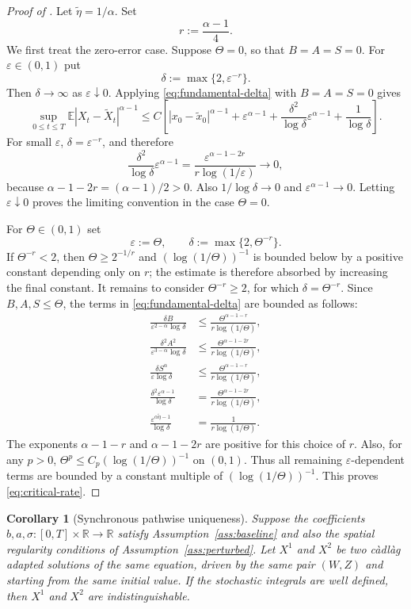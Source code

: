 \documentclass[10pt,a4paper]{amsart}
\newtheorem{corollary}[theorem]{Corollary}
\newcommand{\R}{\mathbb{R}}
\newcommand{\E}{\mathbb{E}}
\newcommand{\1}{\mathbf{1}}
\newcommand{\wt}{\tilde}
\newcommand{\eps}{\varepsilon}
\begin{document}
\begin{proof}[Proof of ]
Let $\wt\eta=1/\alpha$. Set
\[
  r:=\frac{\alpha-1}{4}.
\]
We first treat the zero-error case. Suppose $\Theta=0$, so that $B=A=S=0$. For $\eps\in(0,1)$ put
\[
  \delta:=\max\{2,\eps^{-r}\}.
\]
Then $\delta\to\infty$ as $\eps\downarrow0$. Applying \eqref{eq:fundamental-delta} with $B=A=S=0$ gives
\[
\sup_{0\le t\le T}\E|X_t-\wt X_t|^{\alpha-1}
\le C\left[|x_0-\wt x_0|^{\alpha-1}+\eps^{\alpha-1}
+\frac{\delta^2}{\log\delta}\eps^{\alpha-1}
+\frac{1}{\log\delta}\right].
\]
For small $\eps$, $\delta=\eps^{-r}$, and therefore
\[
  \frac{\delta^2}{\log\delta}\eps^{\alpha-1}
  =\frac{\eps^{\alpha-1-2r}}{r\log(1/\eps)}\longrightarrow0,
\]
because $\alpha-1-2r=(\alpha-1)/2>0$. Also $1/\log\delta\to0$ and $\eps^{\alpha-1}\to0$. Letting $\eps\downarrow0$ proves the limiting convention in the case $\Theta=0$.

For $\Theta\in(0,1)$ set
\[
  \eps:=\Theta,
  \qquad
  \delta:=\max\{2,\Theta^{-r}\}.
\]
If $\Theta^{-r}<2$, then $\Theta\ge 2^{-1/r}$ and $(\log(1/\Theta))^{-1}$ is bounded below by a positive constant depending only on $r$; the estimate is therefore absorbed by increasing the final constant. It remains to consider $\Theta^{-r}\ge2$, for which $\delta=\Theta^{-r}$. Since $B,A,S\le\Theta$, the terms in \eqref{eq:fundamental-delta} are bounded as follows:
\begin{align*}
\frac{\delta B}{\eps^{2-\alpha}\log\delta}
&\le \frac{\Theta^{\alpha-1-r}}{r\log(1/\Theta)},\\
\frac{\delta^2 A^2}{\eps^{3-\alpha}\log\delta}
&\le \frac{\Theta^{\alpha-1-2r}}{r\log(1/\Theta)},\\
\frac{\delta S^\alpha}{\eps\log\delta}
&\le \frac{\Theta^{\alpha-1-r}}{r\log(1/\Theta)},\\
\frac{\delta^2\eps^{\alpha-1}}{\log\delta}
&=\frac{\Theta^{\alpha-1-2r}}{r\log(1/\Theta)},\\
\frac{\eps^{\alpha\wt\eta-1}}{\log\delta}
&=\frac{1}{r\log(1/\Theta)}.
\end{align*}
The exponents $\alpha-1-r$ and $\alpha-1-2r$ are positive for this choice of $r$. Also, for any $p>0$, $\Theta^p\le C_p(\log(1/\Theta))^{-1}$ on $(0,1)$. Thus all remaining $\eps$-dependent terms are bounded by a constant multiple of $(\log(1/\Theta))^{-1}$. This proves \eqref{eq:critical-rate}.
\end{proof}

\begin{corollary}[Synchronous pathwise uniqueness]\label{cor:pathwise-uniqueness}
Suppose the coefficients $b,a,\sigma:[0,T]\times\R\to\R$ satisfy Assumption~\ref{ass:baseline} and also the spatial regularity conditions of Assumption~\ref{ass:perturbed}. Let $X^1$ and $X^2$ be two c\`adl\`ag adapted solutions of the same equation, driven by the same pair $(W,Z)$ and starting from the same initial value. If the stochastic integrals are well defined, then $X^1$ and $X^2$ are indistinguishable.
\end{corollary}
\end{document}

